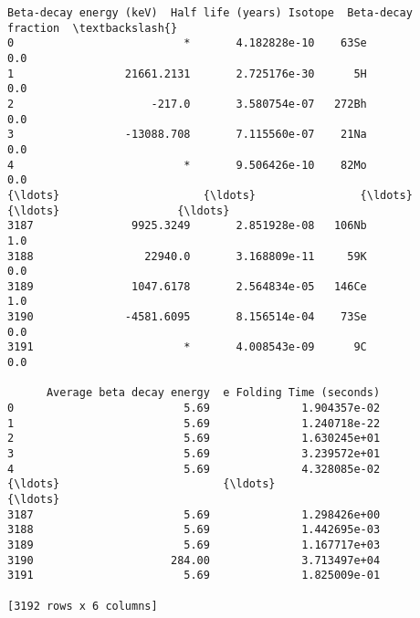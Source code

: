 \documentclass[11pt]{article}
\makeatletter
\newcommand{\boxspacing}{\kern\kvtcb@left@rule\kern\kvtcb@boxsep}
\newcommand{\prompt}[4]{
        \ttfamily\llap{{\color{#2}[#3]:\hspace{3pt}#4}}\vspace{-\baselineskip}
    }
\makeatother
\begin{document}
            \begin{tcolorbox}[breakable, size=fbox, boxrule=.5pt, pad at break*=1mm, opacityfill=0]
\prompt{Out}{outcolor}{2}{\boxspacing}
\begin{Verbatim}[commandchars=\\\{\}]
     Beta-decay energy (keV)  Half life (years) Isotope  Beta-decay fraction  \textbackslash{}
0                          *       4.182828e-10    63Se                  0.0
1                 21661.2131       2.725176e-30      5H                  0.0
2                     -217.0       3.580754e-07   272Bh                  0.0
3                 -13088.708       7.115560e-07    21Na                  0.0
4                          *       9.506426e-10    82Mo                  0.0
{\ldots}                      {\ldots}                {\ldots}     {\ldots}                  {\ldots}
3187               9925.3249       2.851928e-08   106Nb                  1.0
3188                 22940.0       3.168809e-11     59K                  0.0
3189               1047.6178       2.564834e-05   146Ce                  1.0
3190              -4581.6095       8.156514e-04    73Se                  0.0
3191                       *       4.008543e-09      9C                  0.0

      Average beta decay energy  e Folding Time (seconds)
0                          5.69              1.904357e-02
1                          5.69              1.240718e-22
2                          5.69              1.630245e+01
3                          5.69              3.239572e+01
4                          5.69              4.328085e-02
{\ldots}                         {\ldots}                       {\ldots}
3187                       5.69              1.298426e+00
3188                       5.69              1.442695e-03
3189                       5.69              1.167717e+03
3190                     284.00              3.713497e+04
3191                       5.69              1.825009e-01

[3192 rows x 6 columns]
\end{Verbatim}
\end{tcolorbox}
        
\end{document}
